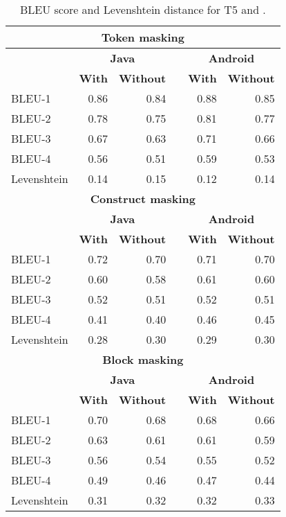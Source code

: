 \begin{table}[h]
	\centering
	\caption{BLEU score and Levenshtein distance for T5 and \roberta.}
	\scriptsize
	\label{tab:bleu}
	\begin{tabular}{lrrrrr}
	\toprule
	\multicolumn{6}{c}{{\bf Token masking}}\\\midrule
	& \multicolumn{2}{c}{{\bf Java}} & & \multicolumn{2}{c}{{\bf Android}}\\ \cline{2-3} \cline{5-6}
	& {\bf With} & {\bf Without} & & {\bf With} & {\bf Without}\\\hline
	BLEU-1 & 0.86 & 0.84 && 0.88 & 0.85\\
	BLEU-2 & 0.78 & 0.75 && 0.81 & 0.77\\
	BLEU-3 & 0.67 & 0.63 && 0.71 & 0.66\\
	BLEU-4 & 0.56 & 0.51 && 0.59 & 0.53\\
	Levenshtein & 0.14 & 0.15 && 0.12 & 0.14\\\midrule
	
	
	\multicolumn{6}{c}{{\bf Construct masking}}\\\midrule
	& \multicolumn{2}{c}{{\bf Java}} & & \multicolumn{2}{c}{{\bf Android}}\\ \cline{2-3} \cline{5-6}
	& {\bf With} & {\bf Without} & & {\bf With} & {\bf Without}\\\hline
	BLEU-1 & 0.72 & 0.70 && 0.71 & 0.70\\
	BLEU-2 & 0.60 & 0.58 && 0.61 & 0.60\\
	BLEU-3 & 0.52 & 0.51 && 0.52 & 0.51\\
	BLEU-4 & 0.41 &0.40 && 0.46 & 0.45\\
	Levenshtein & 0.28 & 0.30 && 0.29 & 0.30 \\\midrule
	
	\multicolumn{6}{c}{{\bf Block masking}}\\\midrule
	& \multicolumn{2}{c}{{\bf Java}} & & \multicolumn{2}{c}{{\bf Android}}\\ \cline{2-3} \cline{5-6}
	& {\bf With} & {\bf Without} & & {\bf With} & {\bf Without}\\\hline
	BLEU-1 & 0.70 & 0.68 && 0.68 & 0.66\\
	BLEU-2 & 0.63 & 0.61 && 0.61 & 0.59\\
	BLEU-3 & 0.56 & 0.54 && 0.55 & 0.52\\
	BLEU-4 & 0.49 & 0.46 && 0.47 & 0.44\\
	Levenshtein & 0.31 & 0.32 &&0.32 & 0.33\\\bottomrule
\end{tabular} 
\end{table}
